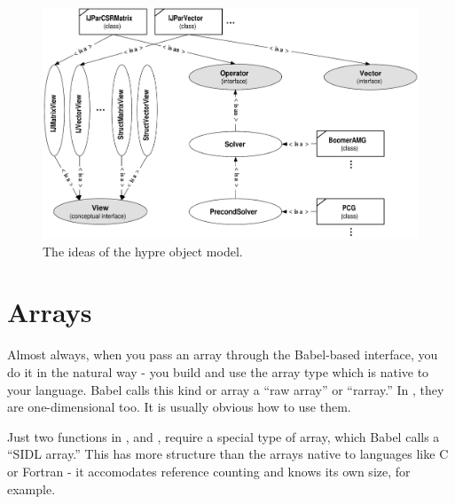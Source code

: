 \begin{figure}
\centering
\includegraphics[width=5in]{figObjectModel}
\caption{%
The ideas of the hypre object model.}
\label{figObjectModel}
\end{figure}





\section{Arrays}
\label{sec-Arrays}

Almost always, when you pass an array through the Babel-based
interface, you do it in the natural way - you build and use the array
type which is native to your language.  Babel calls this kind or array
a ``raw array'' or ``rarray.''  In \hypre{}, they are
one-dimensional too.  It is usually obvious how to use them.

Just two functions in \hypre{},  and
, require a special type of array, which Babel
calls a ``SIDL array.''  This has more structure than the arrays
native to languages like C or Fortran - it accomodates reference
counting and knows its own size, for example.

